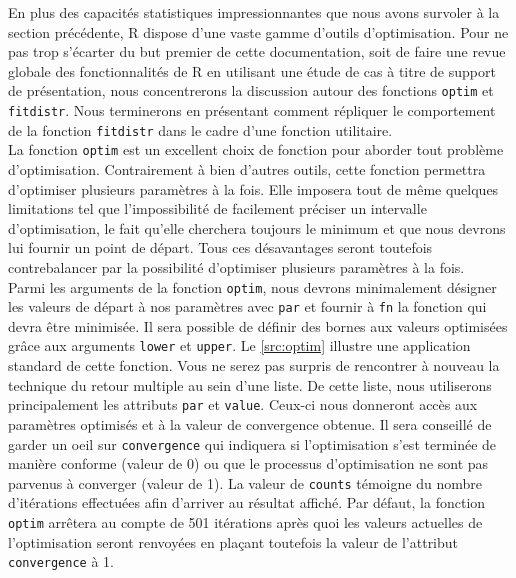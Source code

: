 En plus des capacités statistiques impressionnantes que nous avons survoler à la section précédente, R dispose d'une vaste gamme d'outils d'optimisation. Pour ne pas trop s'écarter du but premier de cette documentation, soit de faire une revue globale des fonctionnalités de R en utilisant une étude de cas à titre de support de présentation, nous concentrerons la discussion autour des fonctions \texttt{optim} et \texttt{fitdistr}. Nous terminerons en présentant comment répliquer le comportement de la fonction \texttt{fitdistr} dans le cadre d'une fonction utilitaire. \\

La fonction \texttt{optim} est un excellent choix de fonction pour aborder tout problème d'optimisation. Contrairement à bien d'autres outils, cette fonction permettra d'optimiser plusieurs paramètres à la fois. Elle imposera tout de même quelques limitations tel que l'impossibilité de facilement préciser un intervalle d'optimisation, le fait qu'elle cherchera toujours le minimum et que nous devrons lui fournir un point de départ. Tous ces désavantages seront toutefois contrebalancer par la possibilité d'optimiser plusieurs paramètres à la fois. \cite{optim} \\

Parmi les arguments de la fonction \texttt{optim}, nous devrons minimalement désigner les valeurs de départ à nos paramètres avec \texttt{par} et fournir à \texttt{fn} la fonction qui devra être minimisée. Il sera possible de définir des bornes aux valeurs optimisées grâce aux arguments \texttt{lower} et \texttt{upper}. Le \autoref{src:optim} illustre une application standard de cette fonction. Vous ne serez pas surpris de rencontrer à nouveau la technique du retour multiple au sein d'une liste. De cette liste, nous utiliserons principalement les attributs \texttt{par} et \texttt{value}. Ceux-ci nous donneront accès aux paramètres optimisés et à la valeur de convergence obtenue. Il sera conseillé de garder un oeil sur \texttt{convergence} qui indiquera si l'optimisation s'est terminée de manière conforme (valeur de 0) ou que le processus d'optimisation ne sont pas parvenus à converger (valeur de 1). La valeur de \texttt{counts} témoigne du nombre d'itérations effectuées afin d'arriver au résultat affiché. Par défaut, la fonction \texttt{optim} arrêtera au compte de 501 itérations après quoi les valeurs actuelles de l'optimisation seront renvoyées en plaçant toutefois la valeur de l'attribut \texttt{convergence} à 1. \\

